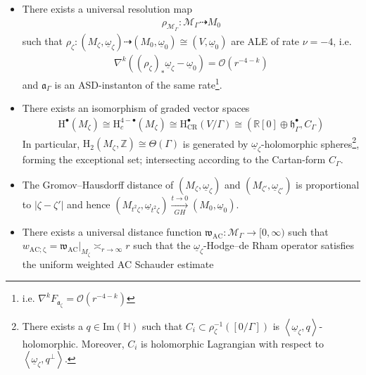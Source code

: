 \documentclass[psamsfonts]{amsart}
\theoremstyle{plain}
\theoremstyle{definition}{
\newtheorem{defi}{Definition}[section]
\newtheorem{ass}{Assumption}
\newtheorem*{nota}{Notation}}
\theoremstyle{remark}{
\newtheorem{rem}{Remark}
\newtheorem{ex}{Example}}
\theoremstyle{plain}{
\newtheorem{thm}{Theorem}[section]
\newtheorem{lem}{Lemma}[section]
\newtheorem{cor}{Corollary}[section]
\newtheorem{prop}{Proposition}[section]
\newtheorem{con}{Conjecture}[section]}
\newcommand{\m}[1]{{\mathrm{#1}}}
\begin{document}
\begin{prop}
\begin{itemize}
\begin{align*}
    \delta_t^*\underline{\omega}_{t^2\zeta}=t^2\underline{\omega}_{\zeta}.
\end{align*}
The identification of the central fibre $(\kappa^{-1}(0),\underline{\omega}_{0})\coloneqq (M_0,\underline{\omega}_0)\cong (V/\Gamma,\underline{\omega}_0)$ is equivariant with respect to both actions by $\m{N}_{\m{SO}(V)}(\Gamma)$ and by $\mathbb{R}_{>0}$ 
\item 
 There exists a universal resolution map 
\begin{align*}
    \rho_{\mathcal{M}_\Gamma}\colon \mathcal{M}_\Gamma\dashrightarrow M_0
\end{align*}
such that $\rho_\zeta\colon (M_\zeta,\underline{\omega}_\zeta)\dashrightarrow (M_0,\underline{\omega}_0)\cong (V,\underline{\omega}_0)$ are ALE of rate $\nu=-4$, i.e.
\begin{align*}
    \nabla^{k}((\rho_\zeta)_*\underline{\omega}_{\zeta}-\underline{\omega}_0)= \mathcal{O}(r^{-4-k})
\end{align*}
and $\mathfrak{a}_\Gamma$ 
is an ASD-instanton of the same rate\footnote{i.e. $\nabla^{k}F_{\mathfrak{a}_\zeta}=\mathcal{O}(r^{-4-k})$}. 
\item There exists an isomorphism of graded vector spaces 
\begin{align*}
    \m{H}^\bullet(M_\zeta)\cong \m{H}^{4-\bullet}_c(M_\zeta)\cong \m{H}^\bullet_{\m{CR}}(V/\Gamma)\cong (\mathbb{R}[0]\oplus \mathfrak{h}^{\bullet}_\Gamma,C_\Gamma)
\end{align*}
In particular, $\m{H}_2(M_\zeta,\mathbb{Z})\cong \Theta(\Gamma)$ is generated by $\underline{\omega}_\zeta$-holomorphic spheres\footnote{There exists a $q\in \m{Im}(\mathbb{H})$ such that $C_i\subset \rho_\zeta^{-1}([0/\Gamma])$ is $\left<\underline{\omega}_\zeta,q\right>$-holomorphic. Moreover, $C_i$ is holomorphic Lagrangian with respect to $\left<\underline{\omega}_\zeta,q^\perp\right>$.}, forming the exceptional set; intersecting according to the Cartan-form $C_\Gamma$.
\item The Gromov--Hausdorff distance of $(M_{\zeta},\underline{\omega}_\zeta)$ and $(M_{\zeta'},\underline{\omega}_{\zeta'})$ is proportional to $|\zeta-\zeta'|$ and hence $(M_{t^2\zeta},\underline{\omega}_{t^2\zeta})\xrightarrow[GH]{t\to 0}(M_0,\underline{\omega}_0)$. 
\item There exists a universal distance function $\mathfrak{w}_{\m{AC}}\colon \mathcal{M}_\Gamma\rightarrow[0,\infty)$ such that $w_{\m{AC;\zeta}}=\mathfrak{w}_{\m{AC}}|_{M_\zeta}\asymp _{r\to \infty} r$ such that the $\underline{\omega}_\zeta$-Hodge--de Rham operator satisfies the uniform weighted AC Schauder estimate 

\end{itemize}
\end{prop}
\end{document}
